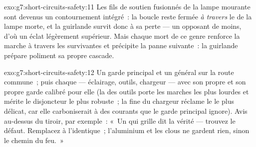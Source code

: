 \begin{solution}{exo:g7:short-circuits-safety:11}
Les fils de soutien fusionnés de la lampe mourante sont devenus un
contournement intégré~: la boucle reste fermée \emph{à travers} le
 de la lampe morte, et la guirlande survit donc à sa
perte --- un opposant de moins, d'où un éclat légèrement supérieur.
Mais chaque mort de ce genre renforce la marche à travers les
survivantes et précipite la panne suivante~: la guirlande prépare
poliment sa propre cascade.
\end{solution}

\begin{solution}{exo:g7:short-circuits-safety:12}
Un garde principal et un  général sur la route commune~;
puis chaque  --- éclairage, outils, chargeur --- avec son
propre  et son propre garde calibré pour elle (la 
des outils porte les marches les plus lourdes et mérite le
disjoncteur le plus robuste~; la  fine du chargeur réclame le
 le plus délicat, car elle carboniserait à des courants que le
garde principal ignore). Avis au-dessus du tiroir, par exemple~: «~Un
 qui grille dit la vérité --- trouvez le défaut. Remplacez à
l'identique~; l'aluminium et les clous ne gardent rien, sinon le
chemin du feu.~»
\end{solution}

